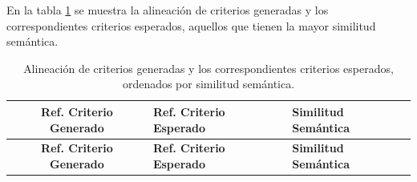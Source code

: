 \documentclass{prgrado}
\begin{document}
En la tabla \ref{tab:alignment_criteria} se muestra la alineación de criterios generadas y los correspondientes criterios esperados, aquellos que tienen la mayor similitud semántica.

\begin{longtable}{|c|p{5cm}|p{4cm}|}
\caption{Alineación de criterios generadas y los correspondientes criterios esperados, ordenados por similitud semántica.}
\label{tab:alignment_criteria} \\
\hline
\textbf{Ref. Criterio Generado} & \textbf{Ref. Criterio Esperado} & \textbf{Similitud Semántica} \\
\hline
\endfirsthead

\hline
\textbf{Ref. Criterio Generado} & \textbf{Ref. Criterio Esperado} & \textbf{Similitud Semántica} \\
\hline
\endhead


\end{longtable}
\end{document}
